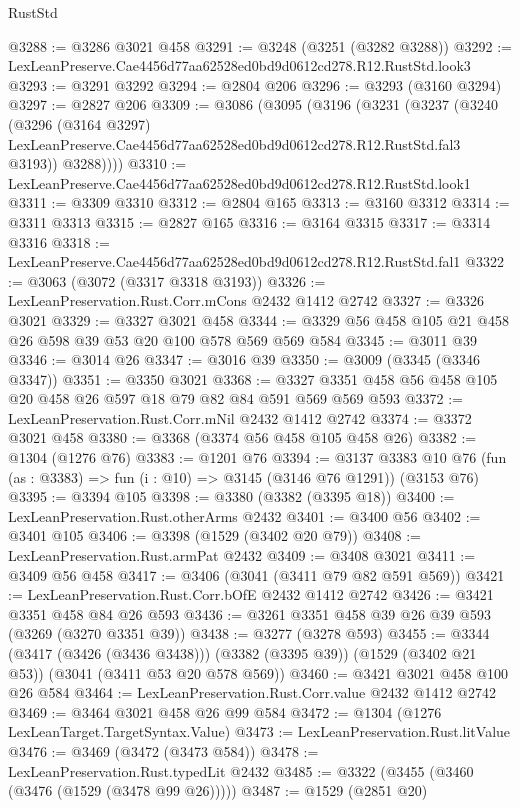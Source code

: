 \begin{lexlean}{RustStd}
\begin{coremodule}
@3288 := @3286 @3021 @458
@3291 := @3248 (@3251 (@3282 @3288))
@3292 := LexLeanPreserve.Cae4456d77aa62528ed0bd9d0612cd278.R12.RustStd.look3
@3293 := @3291 @3292
@3294 := @2804 @206
@3296 := @3293 (@3160 @3294)
@3297 := @2827 @206
@3309 := @3086
    (@3095
      (@3196
        (@3231
          (@3237
            (@3240
              (@3296
                (@3164 @3297)
                LexLeanPreserve.Cae4456d77aa62528ed0bd9d0612cd278.R12.RustStd.fal3
                @3193))
            @3288))))
@3310 := LexLeanPreserve.Cae4456d77aa62528ed0bd9d0612cd278.R12.RustStd.look1
@3311 := @3309 @3310
@3312 := @2804 @165
@3313 := @3160 @3312
@3314 := @3311 @3313
@3315 := @2827 @165
@3316 := @3164 @3315
@3317 := @3314 @3316
@3318 := LexLeanPreserve.Cae4456d77aa62528ed0bd9d0612cd278.R12.RustStd.fal1
@3322 := @3063 (@3072 (@3317 @3318 @3193))
@3326 := LexLeanPreservation.Rust.Corr.mCons @2432 @1412 @2742
@3327 := @3326 @3021
@3329 := @3327 @3021 @458
@3344 := @3329 @56 @458 @105 @21 @458 @26 @598 @39 @53 @20 @100 @578 @569 @569 @584
@3345 := @3011 @39
@3346 := @3014 @26
@3347 := @3016 @39
@3350 := @3009 (@3345 (@3346 @3347))
@3351 := @3350 @3021
@3368 := @3327 @3351 @458 @56 @458 @105 @20 @458 @26 @597 @18 @79 @82 @84 @591 @569 @569 @593
@3372 := LexLeanPreservation.Rust.Corr.mNil @2432 @1412 @2742
@3374 := @3372 @3021 @458
@3380 := @3368 (@3374 @56 @458 @105 @458 @26)
@3382 := @1304 (@1276 @76)
@3383 := @1201 @76
@3394 := @3137
    @3383
    @10
    @76
    (fun (as : @3383) => fun (i : @10) => @3145 (@3146 @76 @1291))
    (@3153 @76)
@3395 := @3394 @105
@3398 := @3380 (@3382 (@3395 @18))
@3400 := LexLeanPreservation.Rust.otherArms @2432
@3401 := @3400 @56
@3402 := @3401 @105
@3406 := @3398 (@1529 (@3402 @20 @79))
@3408 := LexLeanPreservation.Rust.armPat @2432
@3409 := @3408 @3021
@3411 := @3409 @56 @458
@3417 := @3406 (@3041 (@3411 @79 @82 @591 @569))
@3421 := LexLeanPreservation.Rust.Corr.bOfE @2432 @1412 @2742
@3426 := @3421 @3351 @458 @84 @26 @593
@3436 := @3261 @3351 @458 @39 @26 @39 @593 (@3269 (@3270 @3351 @39))
@3438 := @3277 (@3278 @593)
@3455 := @3344
    (@3417 (@3426 (@3436 @3438)))
    (@3382 (@3395 @39))
    (@1529 (@3402 @21 @53))
    (@3041 (@3411 @53 @20 @578 @569))
@3460 := @3421 @3021 @458 @100 @26 @584
@3464 := LexLeanPreservation.Rust.Corr.value @2432 @1412 @2742
@3469 := @3464 @3021 @458 @26 @99 @584
@3472 := @1304 (@1276 LexLeanTarget.TargetSyntax.Value)
@3473 := LexLeanPreservation.Rust.litValue
@3476 := @3469 (@3472 (@3473 @584))
@3478 := LexLeanPreservation.Rust.typedLit @2432
@3485 := @3322 (@3455 (@3460 (@3476 (@1529 (@3478 @99 @26)))))
@3487 := @1529 (@2851 @20)

\end{coremodule}
\end{lexlean}
